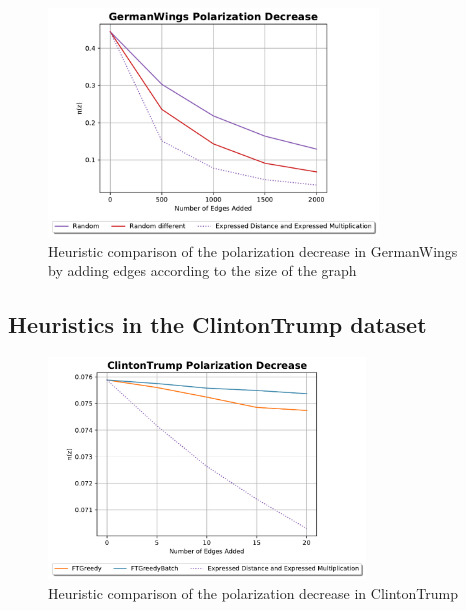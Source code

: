 \begin{figure}[!htbp]
	\centering
	\captionsetup{justification=centering,margin=2cm}
	\includegraphics[width=0.78\textwidth]{Figures/GermanWings Polarization Decrease big}
	\caption{Heuristic comparison of the polarization decrease in GermanWings by adding edges according to the size of the graph}
	\label{fig:GermanWings_big_pol}
\end{figure}

\clearpage


\subsection{Heuristics in the ClintonTrump dataset}

\begin{figure}[!htbp]
	\centering
	\captionsetup{justification=centering,margin=2cm}
	\includegraphics[width=0.75\textwidth]{Figures/ClintonTrump Polarization Decrease}
	\caption{Heuristic comparison of the polarization decrease in ClintonTrump}
	\label{fig:ClintonTrump_pol}
\end{figure}


